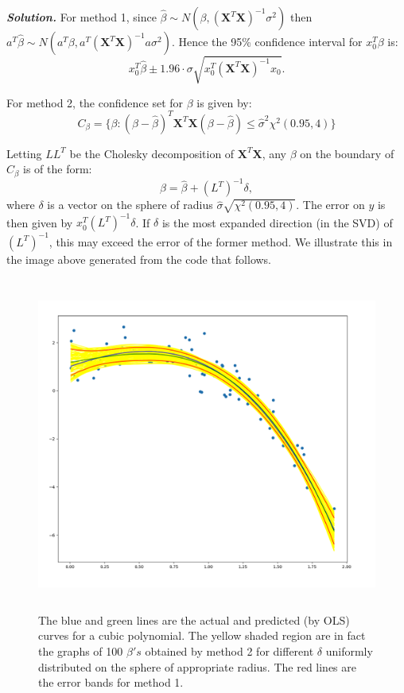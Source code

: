 \documentclass[12pt]{article}
\def\bX{\textbf{X}}
\newenvironment{solution}[1][\it{Solution}]{\textbf{#1. } }{\vspace{.5cm}}
\begin{document}
\begin{solution}
    For method 1, since $\hat{\beta} \sim N(\beta, (\bX^T\bX)^{-1} \sigma^2)$ then $a^T \hat{\beta} \sim N(a^T\beta, a^T(\bX^T\bX)^{-1}a \sigma^2)$. Hence the 95\% confidence interval for $x_0^T \beta$ is:
    $$x_0^T \hat{\beta} \pm 1.96 \cdot \sigma \sqrt{x_0^T(\bX^T\bX)^{-1}x_0}.$$

    For method 2, the confidence set for $\beta$ is given by:
    $$C_\beta = \{\beta: (\beta-\hat{\beta})^T \bX^T \bX (\beta-\hat{\beta}) \leq \hat{\sigma}^2 {\chi^2(0.95, 4)}\}$$

    Letting $LL^T$ be the Cholesky decomposition of $\bX^T\bX$, any $\beta$ on the boundary of $C_\beta$ is of the form:
    $$\beta = \hat{\beta} + (L^T)^{-1}\delta,$$
    where $\delta$ is a vector on the sphere of radius $\hat{\sigma} \sqrt{\chi^2(0.95, 4)}$. The error on $y$ is then given by $x_0^T (L^T)^{-1} \delta$. If $\delta$ is the most expanded direction (in the SVD) of $(L^T)^{-1}$, this may exceed the error of the former method. We illustrate this in the image above generated from the code that follows.


\begin{figure}
\centering
\includegraphics[width = 12cm, height = 11cm]{fig_3.2.png}
\caption{The blue and green lines are the actual and predicted (by OLS) curves for a cubic polynomial.
The yellow shaded region are in fact the graphs of 100 $\beta's$ obtained by method 2 for different $\delta$ uniformly distributed on the sphere of appropriate radius. The red lines are the error bands for method 1. }


\end{figure}
\end{solution}
\end{document}

